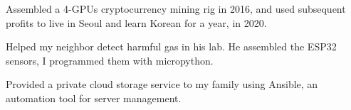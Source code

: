 
\vspace{-.5cm}
\begin{cventries}
  \cventry
  {} %
  {} %
  {} %
  {} %
    {
      \begin{cvitems} %
      \item {Assembled a 4-GPUs cryptocurrency mining rig in 2016, and used subsequent profits to live in Seoul and learn Korean for a year, in 2020.}
      \item{Helped my neighbor detect harmful gas in his lab. He assembled the ESP32 sensors, I programmed them with micropython.}
      \item{Provided a private cloud storage service to my family using Ansible, an automation tool for server management.}
      \end{cvitems}
    }
\end{cventries}
